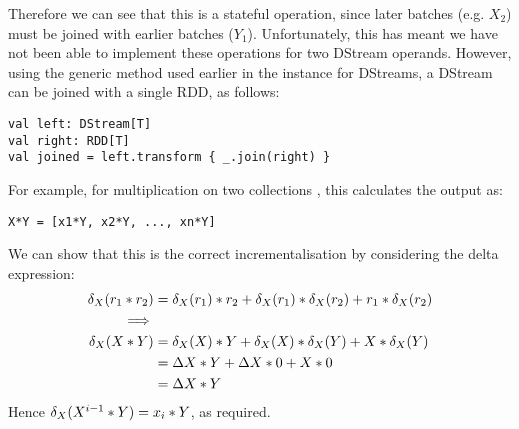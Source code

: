 Therefore we can see that this is a stateful operation, since later batches (e.g. $X_2$) must be joined with earlier batches ($Y_1$). Unfortunately, this has meant we have not been able to implement these operations for two DStream operands. However, using the generic  method used earlier in the  instance for DStreams, a DStream can be joined with a single RDD, as follows:
\vs\begin{lstlisting}
val left: DStream[T]
val right: RDD[T]
val joined = left.transform { _.join(right) }
\end{lstlisting}\vs

For example, for multiplication on two collections , this calculates the output as:
\vs\begin{lstlisting}
X*Y = [x1*Y, x2*Y, ..., xn*Y]
\end{lstlisting}\vs

We can show that this is the correct incrementalisation by considering the delta expression:
\begin{equation*}
\begin{split}
\delta_X(r_1 * r_2) &= \delta_X(r_1)*r_2 + \delta_X(r_1)*\delta_X(r_2) + r_1*\delta_X(r_2) \\
\implies \\
\delta_X(X*Y)& = \delta_X(X)*Y + \delta_X(X)*\delta_X(Y) + X*\delta_X(Y) \\
	  &= \Delta X*Y + \Delta X*0 + X*0 \\
	  &= \Delta X*Y
\end{split}
\end{equation*}
Hence $\delta_X(X^{i-1}*Y) = x_i*Y$, as required.

